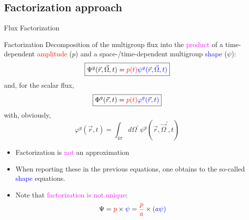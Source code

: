 \documentclass[8pt]{beamer}
\renewcommand{\div}{\vec{\nabla}\! \cdot \!}
\newcommand{\grad}{\vec{\nabla}}
\newcommand{\be}{\begin{equation}}
\newcommand{\ee}{\end{equation}}
\newcommand{\keff}{\ensuremath{k_{\textit{eff}}}}
\newcommand{\tcr}[1]{\textcolor{red}{#1}}
\newcommand{\tcb}[1]{\textcolor{blue}{#1}}
\newcommand{\tcm}[1]{\textcolor{magenta}{#1}}
\begin{document}
%
%
%

\subsection{Factorization approach}

\begin{frame}{Flux Factorization}

\begin{block}{Factorization}
Decomposition of the multigroup flux into the \tcm{product} of a time-dependent \tcr{amplitude} ($p$) and a space-/time-dependent multigroup \tcb{shape} ($\psi$):
\begin{equation*}
\boxed{
\Psi^g(\vec{r},\vec{\Omega},t) = \tcr{p(t)} \tcb{\psi^g (\vec{r},\vec{\Omega},t)}
}
\end{equation*}
and, for the scalar flux,
\begin{equation*}
\boxed{
\Phi^g(\vec{r},t) = \tcr{p(t)} \tcb{\varphi^g(\vec{r},t)}
}
\end{equation*}
with, obviously,
\begin{equation*}
\varphi^g(\vec{r},t) = \int_{4\pi} d\Omega^\prime\, \psi^g(\vec{r},\vec{\Omega}^\prime,t)
\end{equation*}
\end{block}

\begin{block}{}
\begin{itemize}
\item 
Factorization is \tcm{not} an approximation
\item
When reporting these in the previous equations, one obtains to the so-called \tcb{shape} equations.
\item
Note that \tcm{factorization is not unique}: 
\[
\Psi= \tcr{p} \times \tcb{\psi} = \tcr{\frac{p}{a}} \times \tcb{\left( a \psi \right)}
\]
\end{itemize}
\end{block}

\end{frame}
\end{document}
